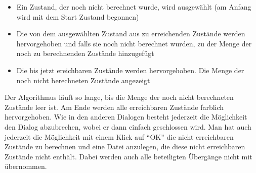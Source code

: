 \begin{itemize}
  \item Ein Zustand, der noch nicht berechnet wurde, wird ausgewählt (am Anfang
  wird mit dem Start Zustand begonnen)
  \item Die von dem ausgewählten Zustand aus zu erreichenden Zustände werden
  hervorgehoben und falls sie noch nicht berechnet wurden, zu der Menge der noch
  zu berechnenden Zustände hinzugefügt
  \item Die bis jetzt ereichbaren Zustände werden hervorgehoben. Die Menge der
  noch nicht berechneten Zustände angezeigt 
\end{itemize}

Der Algorithmus läuft so lange, bis die Menge der noch nicht berechneten Zustände
leer ist. Am Ende werden alle erreichbaren Zustände farblich hervorgehoben. Wie
in den anderen Dialogen besteht jederzeit die Möglichkeit den Dialog abzubrechen,
wobei er dann einfach geschlossen wird. Man hat auch jederzeit die Möglichkeit
mit einem Klick auf "`OK"' die nicht erreichbaren Zustände zu berechnen und eine
Datei anzulegen, die diese nicht erreichbaren Zustände nicht enthält. Dabei
werden auch alle beteiligten Übergänge nicht mit übernommen.
